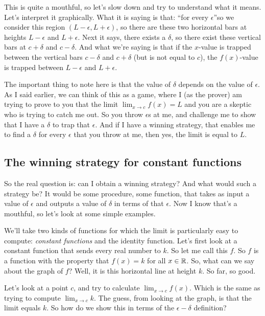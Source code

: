 \documentclass[10pt]{amsart}
\begin{document}
This is quite a mouthful, so let's slow down and try to understand
what it means. Let's interpret it graphically. What it is saying is
that: ``for every $\epsilon$''so we consider this region $(L -
\epsilon, L + \epsilon)$, so there are these two horizontal bars at
heights $L - \epsilon$ and $L + \epsilon$. Next it says, there exists
a $\delta$, so there exist these vertical bars at $c + \delta$ and $c
- \delta$. And what we're saying is that if the $x$-value is trapped
between the vertical bars $c - \delta$ and $c + \delta$ (but is not
equal to $c$), the $f(x)$-value is trapped between $L - \epsilon$ and
$L + \epsilon$.

The important thing to note here is that the value of $\delta$ depends
on the value of $\epsilon$. As I said earlier, we can think of this as
a game, where I (as the prover) am trying to prove to you that the
limit $\lim_{x \to c} f(x) = L$ and you are a skeptic who is trying to
catch me out. So you throw $\epsilon$s at me, and challenge me to show
that I have a $\delta$ to trap that $\epsilon$. And if I have a
winning strategy, that enables me to find a $\delta$ for every
$\epsilon$ that you throw at me, then yes, the limit is equal to $L$.

\subsection{The winning strategy for constant functions}

So the real question is: can I obtain a winning strategy? And what
would such a strategy be? It would be some procedure, some function,
that takes as input a value of $\epsilon$ and outputs a value of
$\delta$ in terms of that $\epsilon$. Now I know that's a mouthful, so
let's look at some simple examples.

We'll take two kinds of functions for which the limit is particularly
easy to compute: {\em constant functions} and the identity
function. Let's first look at a constant function that sends every
real number to $k$. So let me call this $f$. So $f$ is a function with
the property that $f(x) = k$ for all $x \in \mathbb{R}$. So, what can we say
about the graph of $f$? Well, it is this horizontal line at height
$k$. So far, so good.

Let's look at a point $c$, and try to calculate $\lim_{x \to c}
f(x)$. Which is the same as trying to compute $\lim_{x \to c} k$. The
guess, from looking at the graph, is that the limit equals $k$. So how
do we show this in terms of the $\epsilon-\delta$ definition?
\end{document}
